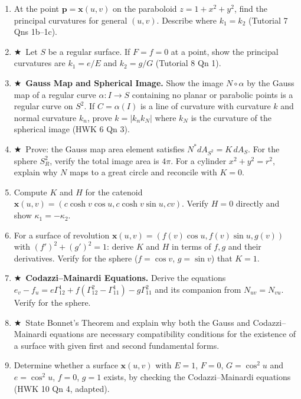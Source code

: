 \documentclass[11pt, a4paper]{article}
\newcommand{\kp}{\kappa}
\newcommand{\hard}{$\bigstar$\ }
\begin{document}
\begin{enumerate}[label=\textbf{Q\arabic*.}, leftmargin=*, itemsep=6pt]
\item At the point $\mathbf{p}=\mathbf{x}(u,v)$ on the paraboloid $z=1+x^2+y^2$, find the principal curvatures for general $(u,v)$. Describe where $k_1=k_2$ (Tutorial 7 Qns 1b--1c).

\item \hard Let $S$ be a regular surface. If $F=f=0$ at a point, show the principal curvatures are $k_1=e/E$ and $k_2=g/G$ (Tutorial 8 Qn 1).

\item \hard \textbf{Gauss Map and Spherical Image.} Show the image $N\circ\alpha$ by the Gauss map of a regular curve $\alpha:I\to S$ containing no planar or parabolic points is a regular curve on $S^2$. If $C=\alpha(I)$ is a line of curvature with curvature $k$ and normal curvature $k_n$, prove $k=|k_n k_N|$ where $k_N$ is the curvature of the spherical image (HWK 6 Qn 3).

\item \hard Prove: the Gauss map area element satisfies $N^*dA_{S^2}=K\,dA_S$. For the sphere $S^2_R$, verify the total image area is $4\pi$. For a cylinder $x^2+y^2=r^2$, explain why $N$ maps to a great circle and reconcile with $K=0$.

\item Compute $K$ and $H$ for the catenoid $\mathbf{x}(u,v)=(c\cosh v\cos u, c\cosh v\sin u, cv)$. Verify $H=0$ directly and show $\kp_1=-\kp_2$.

\item For a surface of revolution $\mathbf{x}(u,v)=(f(v)\cos u, f(v)\sin u, g(v))$ with $(f')^2+(g')^2=1$: derive $K$ and $H$ in terms of $f,g$ and their derivatives. Verify for the sphere ($f=\cos v$, $g=\sin v$) that $K=1$.

\item \hard \textbf{Codazzi--Mainardi Equations.} Derive the equations $e_v-f_u=e\Gamma_{12}^1+f(\Gamma_{12}^2-\Gamma_{11}^1)-g\Gamma_{11}^2$ and its companion from $N_{uv}=N_{vu}$. Verify for the sphere.

\item \hard State Bonnet's Theorem and explain why both the Gauss and Codazzi--Mainardi equations are necessary compatibility conditions for the existence of a surface with given first and second fundamental forms.

\item Determine whether a surface $\mathbf{x}(u,v)$ with $E=1$, $F=0$, $G=\cos^2 u$ and $e=\cos^2 u$, $f=0$, $g=1$ exists, by checking the Codazzi--Mainardi equations (HWK 10 Qn 4, adapted).


\end{enumerate}
\end{document}
